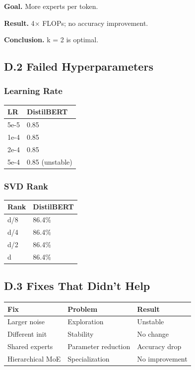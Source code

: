 \textbf{Goal.} More experts per token.

\textbf{Result.} 4$\times$ FLOPs; no accuracy improvement.

\textbf{Conclusion.} k = 2 is optimal.

\subsection{D.2 Failed Hyperparameters}

\subsubsection{Learning Rate}

\begin{table}[H]
\centering
\small
\begin{tabular}{ll}
\toprule
\textbf{LR} & \textbf{DistilBERT} \\
\midrule
5e-5 & 0.85 \\
1e-4 & 0.85 \\
2e-4 & 0.85 \\
5e-4 & 0.85 (unstable) \\
\bottomrule
\end{tabular}
\end{table}

\subsubsection{SVD Rank}

\begin{table}[H]
\centering
\small
\begin{tabular}{ll}
\toprule
\textbf{Rank} & \textbf{DistilBERT} \\
\midrule
d/8 & 86.4\% \\
d/4 & 86.4\% \\
d/2 & 86.4\% \\
d & 86.4\% \\
\bottomrule
\end{tabular}
\end{table}

\subsection{D.3 Fixes That Didn't Help}

\begin{table}[H]
\centering
\small
\begin{tabular}{lll}
\toprule
\textbf{Fix} & \textbf{Problem} & \textbf{Result} \\
\midrule
Larger noise & Exploration & Unstable \\
Different init & Stability & No change \\
Shared experts & Parameter reduction & Accuracy drop \\
Hierarchical MoE & Specialization & No improvement \\
\bottomrule
\end{tabular}
\end{table}

